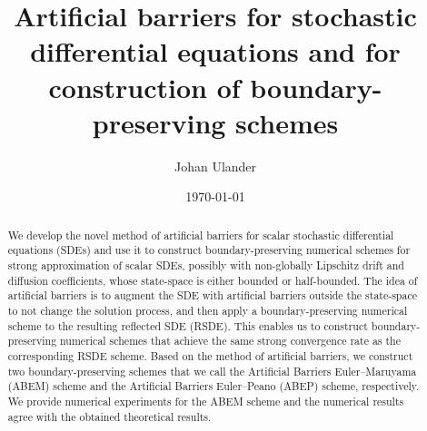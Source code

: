 \documentclass[11pt]{amsart}
\title[]{Artificial barriers for stochastic differential equations and for construction of boundary-preserving schemes}
\date{\today}
\author{Johan Ulander}
\begin{document}
\begin{abstract}
We develop the novel method of artificial barriers for scalar stochastic differential equations (SDEs) and use it to construct boundary-preserving numerical schemes for strong approximation of scalar SDEs, possibly with non-globally Lipschitz drift and diffusion coefficients, whose state-space is either bounded or half-bounded. The idea of artificial barriers is to augment the SDE with artificial barriers outside the state-space to not change the solution process, and then apply a boundary-preserving numerical scheme to the resulting reflected SDE (RSDE). This enables us to construct boundary-preserving numerical schemes that achieve the same strong convergence rate as the corresponding RSDE scheme. Based on the method of artificial barriers, we construct two boundary-preserving schemes that we call the Artificial Barriers Euler--Maruyama (ABEM) scheme and the Artificial Barriers Euler--Peano (ABEP) scheme, respectively. We provide numerical experiments for the ABEM scheme and the numerical results agree with the obtained theoretical results.
\end{abstract}
\end{document}
